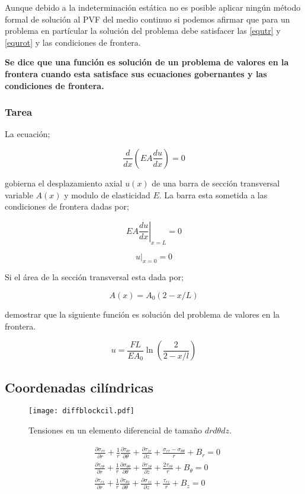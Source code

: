 \documentclass[../notas medios.tex]{subfiles}
\begin{document}
Aunque debido a la indeterminación estática no es posible aplicar ningún método formal de solución al PVF del medio continuo si podemos afirmar que para un problema en partícular la solución del problema debe satisfacer las \cref{equtr} y \cref{equrot} y las condiciones de frontera.

\textbf{Se dice que una función es solución de un problema de valores en la frontera cuando esta satisface sus ecuaciones gobernantes y las condiciones de frontera.}  


\subsubsection{Tarea}

La ecuación;

\[\frac{d}{{dx}}\left( {EA\frac{{du}}{{dx}}} \right) = 0\]

gobierna el desplazamiento axial $u(x)$ de una barra de sección transversal variable $A(x)$ y modulo de elasticidad $E$. La barra esta sometida a las condiciones de frontera dadas por;

\[{\left. {EA\frac{{du}}{{dx}}} \right|_{x = L}} = 0\]

\[{\left. u \right|_{x = 0}} = 0\]

Si el área de la sección transversal esta dada por;

\[A(x) = {A_0}(2 - x/L)\]

demostrar que la siguiente función es solución del problema de valores en la frontera.

\[u = \frac{{FL}}{{E{A_0}}}\ln \left( {\frac{2}{{2 - x/l}}} \right)\]

\subsection{Coordenadas cilíndricas}


\begin{figure}[H]
\centering
	\texttt{[image: diffblockcil.pdf]}
	\caption{Tensiones en un elemento diferencial de tamaño $dr{d\theta}dz$.}
	\label{diffcil}
\end{figure}

\begin{equation} \label{equcil}
\begin{split}
& \frac{{\partial {\sigma _{rr}}}}{{\partial r}} + \frac{1}{r}  \frac{{\partial {\tau _{{\theta}r}}}}{{\partial \theta}} + \frac{{\partial {\tau _{zr}}}}{{\partial z}} + \frac{\sigma _{rr} - \sigma _{{\theta}{\theta}}}{r} + {B_r} = 0 \\
& \frac{{\partial {\tau _{r{\theta}}}}}{{\partial r}} + \frac{1}{r} \frac{{\partial {\sigma _{{\theta}{\theta}}}}}{{\partial \theta}} + \frac{{\partial {\tau _{z{\theta}}}}}{{\partial z}} +  \frac{2 \tau_{r{\theta}}}{r} + {B_\theta} = 0 \\
& \frac{{\partial {\tau _{rz}}}}{{\partial r}} + \frac{1}{r} \frac{{\partial {\tau _{{\theta}z}}}}{{\partial \theta}} + \frac{{\partial {\sigma _{zz}}}}{{\partial z}} + \frac{ \tau_{rz}}{r} + {B_z} = 0 
\end{split}
\end{equation}
\end{document}
